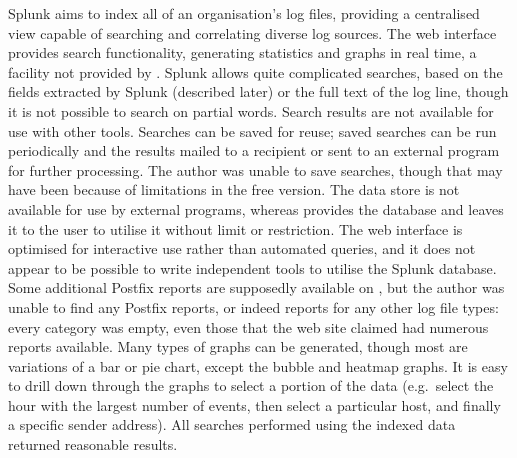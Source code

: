 Splunk aims to index all of an organisation's log files, providing a
centralised view capable of searching and correlating diverse log sources.
The web interface provides search functionality, generating statistics and
graphs in real time, a facility not provided by \parsername{}.  Splunk
allows quite complicated searches, based on the fields extracted by Splunk
(described later) or the full text of the log line, though it is not
possible to search on partial words.  Search results are not available for
use with other tools.  Searches can be saved for reuse; saved searches can
be run periodically and the results mailed to a recipient or sent to an
external program for further processing.  The author was unable to save
searches, though that may have been because of limitations in the free
version.  The data store is not available for use by external programs,
whereas \parsername{} provides the database and leaves it to the user to
utilise it without limit or restriction.  The web interface is optimised
for interactive use rather than automated queries, and it does not appear
to be possible to write independent tools to utilise the Splunk database.
Some additional Postfix reports are supposedly available on
, but the author was
unable to find any Postfix reports, or indeed reports for any other log
file types: every category was empty, even those that the web site claimed
had numerous reports available.  Many types of graphs can be generated,
though most are variations of a bar or pie chart, except the bubble and
heatmap graphs.  It is easy to drill down through the graphs to select a
portion of the data (e.g.\ select the hour with the largest number of
events, then select a particular host, and finally a specific sender
address).  All searches performed using the indexed data returned
reasonable results.

